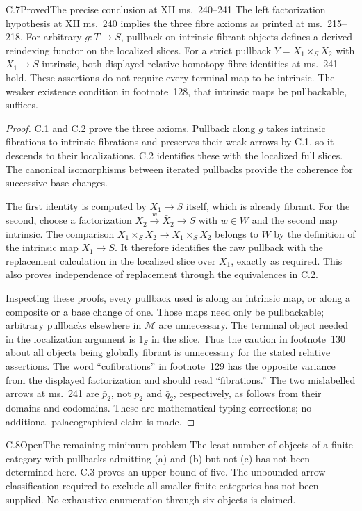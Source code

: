 \begin{claim}{C.7}{Proved}{The precise conclusion at XII ms.~240--241}
The left factorization hypothesis at XII ms.~240 implies the
three fibre axioms as printed at ms.~215--218. For arbitrary
$g:T\to S$, pullback on intrinsic fibrant objects defines a
derived reindexing functor on the localized slices. For a
strict pullback $Y=X_1\times_S X_2$ with $X_1\to S$ intrinsic,
both displayed relative homotopy-fibre identities at ms.~241
hold. These assertions do not require every terminal map to
be intrinsic. The weaker existence condition in footnote~128,
that intrinsic maps be pullbackable, suffices.
\end{claim}
\begin{proof}
C.1 and C.2 prove the three axioms. Pullback along $g$ takes
intrinsic fibrations to intrinsic fibrations and preserves
their weak arrows by C.1, so it descends to their localizations.
C.2 identifies these with the localized full slices. The
canonical isomorphisms between iterated pullbacks provide the
coherence for successive base changes.

The first identity is computed by $X_1\to S$ itself, which
is already fibrant. For the second, choose a factorization
$X_2\xrightarrow w\bar X_2\to S$ with $w\in W$ and the
second map intrinsic. The comparison
$X_1\times_SX_2\to X_1\times_S\bar X_2$ belongs to $W$
by the definition of the intrinsic map $X_1\to S$.
It therefore identifies the raw pullback with the replacement
calculation in the localized slice over $X_1$, exactly as
required. This also proves independence of replacement
through the equivalences in C.2.

Inspecting these proofs, every pullback used is along an
intrinsic map, or along a composite or a base change of one.
Those maps need only be pullbackable; arbitrary pullbacks
elsewhere in $\mathcal M$ are unnecessary. The terminal
object needed in the localization argument is $1_S$ in the
slice. Thus the caution in footnote~130 about all objects
being globally fibrant is unnecessary for the stated
relative assertions. The word ``cofibrations'' in
footnote~129 has the opposite variance from the displayed
factorization and should read ``fibrations.'' The two
mislabelled arrows at ms.~241 are $\bar p_2$, not $p_2$
and $\bar q_2$, respectively, as follows from their domains
and codomains. These are mathematical typing corrections;
no additional palaeographical claim is made.
\end{proof}

\begin{claim}{C.8}{Open}{The remaining minimum problem}
The least number of objects of a finite category with pullbacks
admitting (a) and (b) but not (c) has not been determined here.
C.3 proves an upper bound of five. The unbounded-arrow
classification required to exclude all smaller finite
categories has not been supplied. No exhaustive enumeration
through six objects is claimed.
\end{claim}

